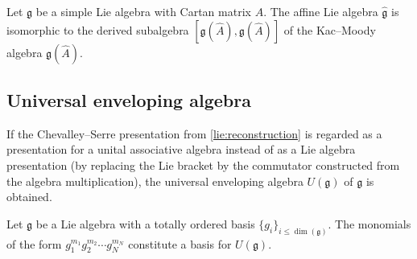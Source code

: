     \begin{property}
        Let $\mathfrak{g}$ be a simple Lie algebra with Cartan matrix $A$. The affine Lie algebra $\widehat{\mathfrak{g}}$ is isomorphic to the derived subalgebra $[\mathfrak{g}(\widehat{A}),\mathfrak{g}(\widehat{A})]$ of the Kac--Moody algebra $\mathfrak{g}(\widehat{A})$.
    \end{property}

\subsection{Universal enveloping algebra}\label{section:universal_enveloping_algebra}


    \begin{construct}\label{lie:enveloping_algebra_construct}
        If the Chevalley--Serre presentation from \cref{lie:reconstruction} is regarded as a presentation for a unital associative algebra instead of as a Lie algebra presentation (by replacing the Lie bracket by the commutator constructed from the algebra multiplication), the universal enveloping algebra $U(\mathfrak{g})$ of $\mathfrak{g}$ is obtained.
    \end{construct}

    \begin{theorem}\label{lie:pbw}
        Let $\mathfrak{g}$ be a Lie algebra with a totally ordered basis $\{g_i\}_{i\leq\dim(\mathfrak{g})}$. The monomials of the form $g_1^{m_1}g_2^{m_2}\cdots g_N^{m_N}$ constitute a basis for $U(\mathfrak{g})$.
    \end{theorem}

